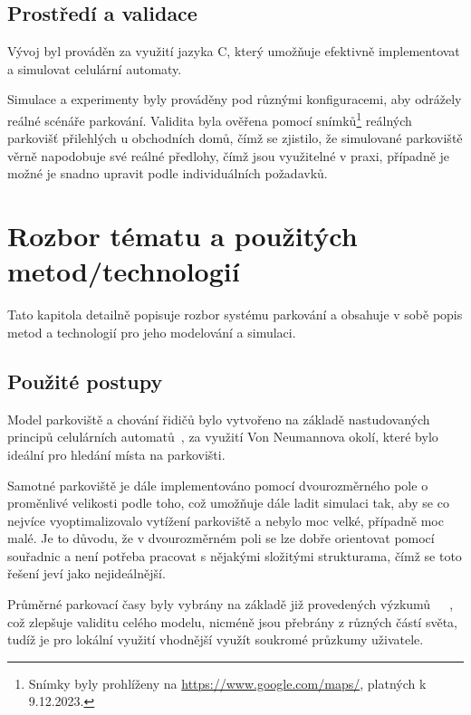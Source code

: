 \documentclass[11pt, a4paper]{article}
\begin{document}
\subsection{Prostředí a validace}

Vývoj byl prováděn za využití jazyka C, který umožňuje efektivně implementovat a simulovat celulární automaty.

Simulace a experimenty byly prováděny pod různými konfiguracemi, aby odrážely reálné scénáře parkování. Validita byla ověřena pomocí snímků\footnote{Snímky byly prohlíženy na \url{https://www.google.com/maps/}, platných k 9.12.2023.} reálných parkovišť přilehlých u obchodních domů, čímž se zjistilo, že simulované parkoviště věrně napodobuje své reálné předlohy, čímž jsou využitelné v praxi, případně je možné je snadno upravit podle individuálních požadavků.

\section{Rozbor tématu a použitých metod/technologií}

Tato kapitola detailně popisuje rozbor systému parkování a obsahuje v sobě popis metod a technologií pro jeho modelování a simulaci.

\subsection{Použité postupy}

Model parkoviště a chování řidičů bylo vytvořeno na základě nastudovaných principů celulárních automatů~\cite{Peringer_2023}, za využití Von Neumannova okolí, které bylo ideální pro hledání místa na parkovišti.

Samotné parkoviště je dále implementováno pomocí dvourozměrného pole o proměnlivé velikosti podle toho, což umožňuje dále ladit simulaci tak, aby se co nejvíce vyoptimalizovalo vytížení parkoviště a nebylo moc velké, případně moc malé. Je to důvodu, že v dvourozměrném poli se lze dobře orientovat pomocí souřadnic a není potřeba pracovat s nějakými složitými strukturama, čímž se toto řešení jeví jako nejideálnější.

Průměrné parkovací časy byly vybrány na základě již provedených výzkumů~\cite{Arndt_Gronmo_1977}~\cite{Bawa_Sinha_Kant_2019}~\cite{Rodgers_2023}, což zlepšuje validitu celého modelu, nicméně jsou přebrány z různých částí světa, tudíž je pro lokální využití vhodnější využít soukromé průzkumy uživatele.
\end{document}
